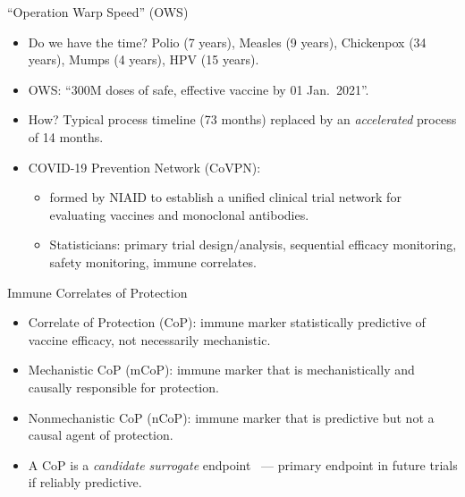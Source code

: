 \documentclass{beamer}
\begin{document}
\begin{frame}[c]{``Operation Warp Speed'' (OWS)}

\begin{center}
\begin{itemize}
  \itemsep10pt
  \item Do we have the time? Polio (7 years), Measles (9 years), Chickenpox (34
     years), Mumps (4 years), HPV (15 years).
  \item OWS: ``300M doses of safe, effective vaccine by 01 Jan.~2021''.
  \item How? Typical process timeline (73 months) replaced by an
      \textit{accelerated} process of 14 months.
  \item COVID-19 Prevention Network (CoVPN):
      \begin{itemize}
          \item formed by NIAID to establish a unified clinical trial network
              for evaluating vaccines and monoclonal antibodies.
          \item Statisticians: primary trial design/analysis,
          sequential efficacy monitoring, safety monitoring, immune correlates.
      \end{itemize}
\end{itemize}
\end{center}

\note{
}

\end{frame}


\begin{frame}[c]{Immune Correlates of
  Protection~\citep{plotkin2012nomenclature}}

\begin{center}
\begin{itemize}
  \itemsep10pt
  \item Correlate of Protection (CoP): immune marker statistically predictive
    of vaccine efficacy, not necessarily mechanistic.
  \item Mechanistic CoP (mCoP): immune marker that is mechanistically and
    causally responsible for protection.
  \item Nonmechanistic CoP (nCoP): immune marker that is predictive but not a
    causal agent of protection.
  \item A CoP is a \textit{candidate surrogate}
      endpoint~\citep{prentice1989surrogate} --- primary
      endpoint in future trials if reliably predictive.
\end{itemize}
\end{center}

\note{
}

\end{frame}
\end{document}
